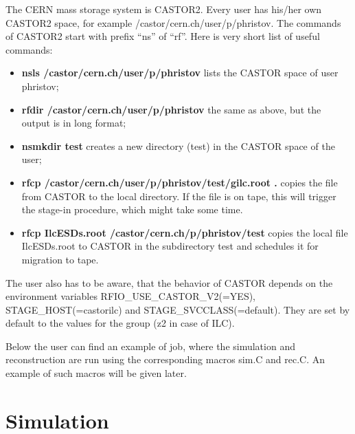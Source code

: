 \documentclass[12pt,a4paper,twoside]{article}
\begin{document}
The CERN mass storage system is CASTOR2\cite{CASTOR2}.  Every user has
his/her own CASTOR2 space, for example /castor/cern.ch/user/p/phristov.
The commands of CASTOR2 start with prefix ``ns'' of ``rf''. Here is
very short list of useful commands:

\begin{itemize}
\item \textbf{nsls /castor/cern.ch/user/p/phristov} lists the CASTOR
  space of user phristov;
\item \textbf{rfdir /castor/cern.ch/user/p/phristov} the same as
  above, but the output is in long format;
\item \textbf{nsmkdir test} creates a new directory (test) in the
  CASTOR space of the user;
\item \textbf{rfcp /castor/cern.ch/user/p/phristov/test/gilc.root .}
  copies the file from CASTOR to the local directory. If the file is
  on tape, this will trigger the stage-in procedure, which might take
  some time.
\item \textbf{rfcp IlcESDs.root /castor/cern.ch/p/phristov/test}
  copies the local file IlcESDs.root to CASTOR in the subdirectory
  test and schedules it for migration to tape.
\end{itemize}

The user also has to be aware, that the behavior of CASTOR depends on
the environment variables RFIO\_USE\_CASTOR\_V2(=YES),
STAGE\_HOST(=castorilc) and STAGE\_SVCCLASS(=default). They are set
by default to the values for the group (z2 in case of ILC).

Below the user can find an example of job, where the simulation and
reconstruction are run using the corresponding macros sim.C and rec.C.
An example of such macros will be given later.




\newpage
\section{Simulation} \label{Simulation}

\end{document}
